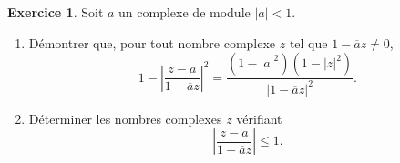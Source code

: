 \documentclass[a4paper, 11pt,openany]{article}%
\theoremstyle{plain}
\theoremstyle{definition}
\newtheorem{exo}{Exercice}
\newtheorem{sol}{Solution de l'exercice}
\theoremstyle{remark}
\begin{document}

\begin{exo}
Soit $a$ un complexe de module $|a|<1$.
\begin{enumerate}
\item Démontrer que, pour tout nombre complexe $z$ tel que $1- \overline{a}z \neq 0$,
\[ 1- \left| \frac{z-a}{1- \overline{a} z} \right|^2 = \frac{(1-|a|^2)(1-|z|^2)}{|1-\overline{a}z|^2}.\]
\item Déterminer les nombres complexes $z$ vérifiant 
\[ \left| \frac{z-a}{1 - \overline{a}z} \right| \leqslant 1.\]
\end{enumerate}
\end{exo}

   
\end{document}
